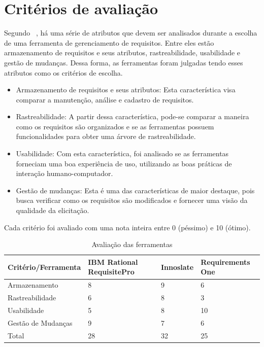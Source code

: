 \section{Critérios de avaliação}

Segundo ~\cite{beatty}, há uma série de atributos que devem ser analisados durante a escolha de uma ferramenta de gerenciamento de requisitos. Entre eles estão armazenamento de requisitos e seus atributos, rastreabilidade, usabilidade e gestão de mudanças. Dessa forma, as ferramentas foram julgadas tendo esses atributos como os critérios de escolha.

\begin{itemize}
\item Armazenamento de requisitos e seus atributos: Esta característica visa comparar a manutenção, análise e cadastro de requisitos.
\item Rastreabilidade: A partir dessa característica, pode-se comparar a maneira como os requisitos são organizados e se as ferramentas possuem funcionalidades para obter uma árvore de rastreabilidade.
\item Usabilidade: Com esta característica, foi analisado se as ferramentas forneciam uma boa experiência de uso, utilizando as boas práticas de interação humano-computador.
\item Gestão de mudanças: Esta é uma das características de maior destaque, pois busca verificar como os requisitos são modificados e fornecer uma visão da qualidade da elicitação.
\end{itemize}

Cada critério foi avaliado com uma nota inteira entre 0 (péssimo) e 10 (ótimo).

\begin{table}[]
\centering
\label{tools-performance}
\begin{tabular}{|l|l|l|l|}
\hline
Critério/Ferramenta                          & IBM Rational RequisitePro & Innoslate & Requirements One \\ \hline
Armazenamento                                & 8                         & 9         & 6                \\ \hline
Rastreabilidade                              & 6                         & 8         & 3                \\ \hline
Usabilidade                                  & 5                         & 8         & 10               \\ \hline
Gestão de Mudanças                           & 9                         & 7         & 6                \\ \hline
Total                                        & 28                        & 32        & 25               \\ \hline
\end{tabular}
\caption{Avaliação das ferramentas}
\end{table}

